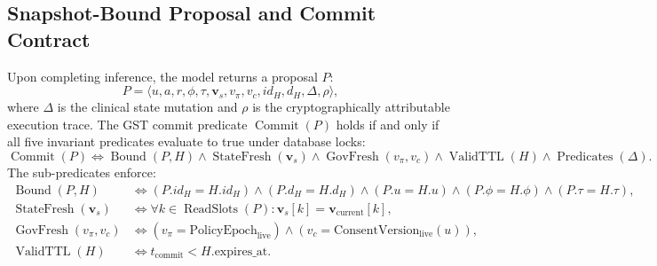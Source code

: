 \documentclass[11pt,a4paper]{article}
\begin{document}
\subsection{Snapshot-Bound Proposal and Commit Contract}
Upon completing inference, the model returns a proposal $P$:
\begin{equation}
P = \langle u, a, r, \phi, \tau, \mathbf{v}_s, v_{\pi}, v_c, id_H, d_H, \Delta, \rho \rangle,
\label{eq:proposal_formal}
\end{equation}
where $\Delta$ is the clinical state mutation and $\rho$ is the cryptographically attributable execution trace. The GST commit predicate $\operatorname{Commit}(P)$ holds if and only if all five invariant predicates evaluate to true under database locks:
\begin{equation}
\operatorname{Commit}(P) \iff \operatorname{Bound}(P, H) \land \operatorname{StateFresh}(\mathbf{v}_s) \land \operatorname{GovFresh}(v_{\pi}, v_c) \land \operatorname{ValidTTL}(H) \land \operatorname{Predicates}(\Delta).
\label{eq:commit_predicate}
\end{equation}
The sub-predicates enforce:
\begin{align}
\operatorname{Bound}(P, H) &\iff (P.id_H = H.id_H) \land (P.d_H = H.d_H) \land (P.u = H.u) \land (P.\phi = H.\phi) \land (P.\tau = H.\tau), \label{eq:bound}\\
\operatorname{StateFresh}(\mathbf{v}_s) &\iff \forall k \in \operatorname{ReadSlots}(P): \mathbf{v}_s[k] = \mathbf{v}_{\text{current}}[k], \label{eq:state_fresh}\\
\operatorname{GovFresh}(v_{\pi}, v_c) &\iff (v_{\pi} = \text{PolicyEpoch}_{\text{live}}) \land (v_c = \text{ConsentVersion}_{\text{live}}(u)), \label{eq:gov_fresh}\\
\operatorname{ValidTTL}(H) &\iff t_{\text{commit}} < H.\text{expires\_at}. \label{eq:valid_ttl}
\end{align}
\end{document}

